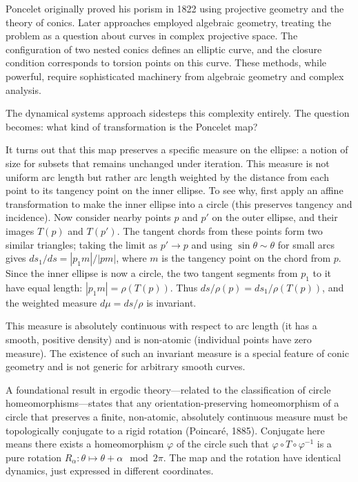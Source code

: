 Poncelet originally proved his porism in 1822 using projective geometry and the theory of conics. Later approaches employed algebraic geometry, treating the problem as a question about curves in complex projective space. The configuration of two nested conics defines an elliptic curve, and the closure condition corresponds to torsion points on this curve. These methods, while powerful, require sophisticated machinery from algebraic geometry and complex analysis.

The dynamical systems approach sidesteps this complexity entirely. The question becomes: what kind of transformation is the Poncelet map?

It turns out that this map preserves a specific measure on the ellipse: a notion of \SQQOpen{}size\SQQClose{} for subsets that remains unchanged under iteration. This measure is not uniform arc length but rather arc length weighted by the distance from each point to its tangency point on the inner ellipse. To see why, first apply an affine transformation to make the inner ellipse into a circle (this preserves tangency and incidence). Now consider nearby points $p$ and $p'$ on the outer ellipse, and their images $T(p)$ and $T(p')$. The tangent chords from these points form two similar triangles; taking the limit as $p' \to p$ and using $\sin\theta \sim \theta$ for small arcs gives $d s_1 / d s = |p_1 m| / |pm|$, where $m$ is the tangency point on the chord from $p$. Since the inner ellipse is now a circle, the two tangent segments from $p_1$ to it have equal length: $|p_1 m| = \rho(T(p))$. Thus $d s / \rho(p) = d s_1 / \rho(T(p))$, and the weighted measure $d\mu = ds/\rho$ is invariant.

This measure is absolutely continuous with respect to arc length (it has a smooth, positive density) and is non-atomic (individual points have zero measure). The existence of such an invariant measure is a special feature of conic geometry and is not generic for arbitrary smooth curves.

A foundational result in ergodic theory—related to the classification of circle homeomorphisms—states that any orientation-preserving homeomorphism of a circle that preserves a finite, non-atomic, absolutely continuous measure must be topologically conjugate to a rigid rotation (Poincaré, 1885). \QSOpen{}Conjugate\QSClose{} here means there exists a homeomorphism $\varphi$ of the circle such that $\varphi \circ T \circ \varphi^{-1}$ is a pure rotation $R_\alpha: \theta \mapsto \theta + \alpha \mod 2\pi$. The map and the rotation have identical dynamics, just expressed in different coordinates.

